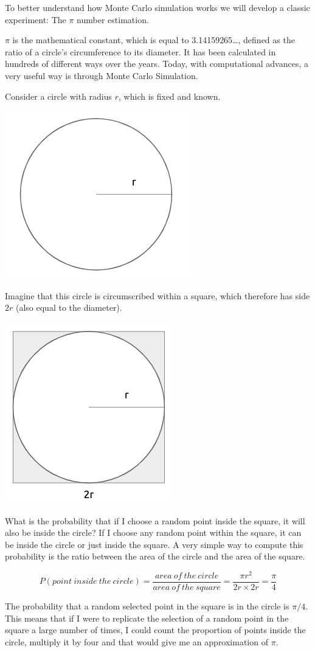 \documentclass[
]{book}
\theoremstyle{definition}
\theoremstyle{definition}
\theoremstyle{definition}
\theoremstyle{definition}
\theoremstyle{remark}
\begin{document}
To better understand how Monte Carlo simulation works we will develop a classic experiment: The \(\pi\) number estimation.

\(\pi\) is the mathematical constant, which is equal to 3.14159265\ldots, defined as the ratio of a circle's circumference to its diameter. It has been calculated in hundreds of different ways over the years. Today, with computational advances, a very useful way is through Monte Carlo Simulation.

Consider a circle with radius \(r\), which is fixed and known.

\begin{center}\includegraphics[width=0.25\linewidth]{images/Circle-radio} \end{center}

Imagine that this circle is circumscribed within a square, which therefore has side \(2r\) (also equal to the diameter).

\begin{center}\includegraphics[width=0.25\linewidth]{images/Circle-square} \end{center}

What is the probability that if I choose a random point inside the square, it will also be inside the circle? If I choose any random point within the square, it can be inside the circle or just inside the square. A very simple way to compute this probability is the ratio between the area of the circle and the area of the square.

\[
P(point\ inside\ the\ circle) = \frac{area\ of\ the\ circle}{area\ of\ the\ square}=\frac{\pi r^2}{2r\times 2r}=\frac{\pi}{4}
\]

The probability that a random selected point in the square is in the circle is \(\pi/4\). This means that if I were to replicate the selection of a random point in the square a large number of times, I could count the proportion of points inside the circle, multiply it by four and that would give me an approximation of \(\pi\).
\end{document}
